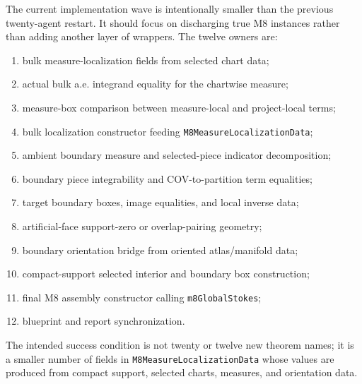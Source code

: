 \begin{proposition}
  \label{anc:m8_current_twelve_agent_wave}
  \begingroup\raggedright
  The current implementation wave is intentionally smaller than the previous
  twenty-agent restart.  It should focus on discharging true M8 instances
  rather than adding another layer of wrappers.  The twelve owners are:
  \begin{enumerate}
    \item bulk measure-localization fields from selected chart data;
    \item actual bulk a.e. integrand equality for the chartwise measure;
    \item measure-box comparison between measure-local and project-local terms;
    \item bulk localization constructor feeding \texttt{M8MeasureLocalizationData};
    \item ambient boundary measure and selected-piece indicator decomposition;
    \item boundary piece integrability and COV-to-partition term equalities;
    \item target boundary boxes, image equalities, and local inverse data;
    \item artificial-face support-zero or overlap-pairing geometry;
    \item boundary orientation bridge from oriented atlas/manifold data;
    \item compact-support selected interior and boundary box construction;
    \item final M8 assembly constructor calling \texttt{m8GlobalStokes};
    \item blueprint and report synchronization.
  \end{enumerate}
  The intended success condition is not twenty or twelve new theorem names; it
  is a smaller number of fields in \texttt{M8MeasureLocalizationData} whose
  values are produced from compact support, selected charts, measures, and
  orientation data.
  \par\endgroup
\end{proposition}

